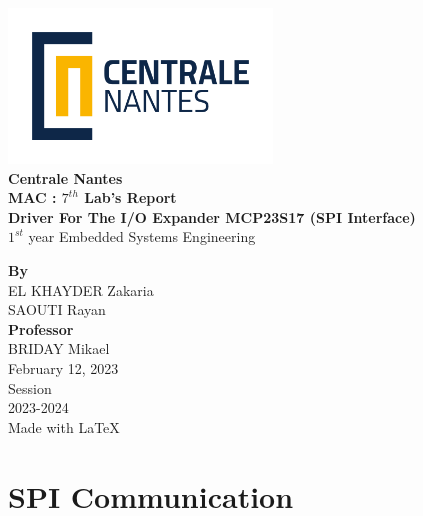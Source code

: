 \documentclass{article}
\begin{document}
\makeatletter
\begin{titlepage}
\begin{center}
    
\includegraphics[width=7cm]{assets/LogoCN_Q.png}
\\
\textbf{\large{Centrale Nantes}}
\\[2cm]

\textbf{\large{MAC : $7^{th}$ Lab's Report \\
Driver For The I/O Expander MCP23S17 (SPI Interface) }}
\\[14pt]
$1^{st}$ year Embedded Systems Engineering
\\[2cm]


\vfill

\textbf{By} \\
EL KHAYDER Zakaria \\
SAOUTI Rayan
\\[1cm]

\textbf{Professor} \\
BRIDAY Mikael
\\[3cm]


February 12, 2023 \\ [12pt]

Session \\
2023-2024 \\[12pt]
\small{Made with \LaTeX}
\end{center}
\end{titlepage}
\makeatother

\pagebreak

\setcounter{page}{1}

\clearpage
{}
\tableofcontents

\clearpage

\listoffigures
{}
\listoflistings

\clearpage

\setcounter{page}{1}


\section{SPI Communication}
\end{document}
